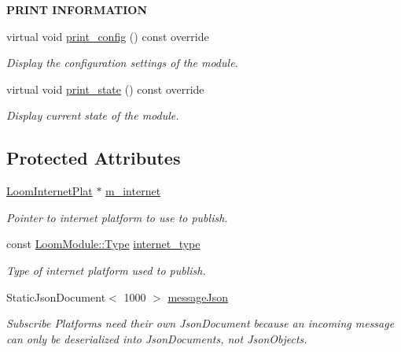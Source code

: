 \begin{Indent}{\bf P\+R\+I\+NT I\+N\+F\+O\+R\+M\+A\+T\+I\+ON}\par
\begin{DoxyCompactItemize}
\item 
virtual void \hyperlink{class_loom_subscribe_plat_a574b062d74e998a12cdb54d265c36972}{print\+\_\+config} () const override
\begin{DoxyCompactList}\small\item\em Display the configuration settings of the module. \end{DoxyCompactList}\item 
virtual void \hyperlink{class_loom_subscribe_plat_ace7e2ccbd9a8b5155bfabb2fd2e38d33}{print\+\_\+state} () const override
\begin{DoxyCompactList}\small\item\em Display current state of the module. \end{DoxyCompactList}\end{DoxyCompactItemize}
\end{Indent}
\subsection*{Protected Attributes}
\begin{DoxyCompactItemize}
\item 
\hyperlink{class_loom_internet_plat}{Loom\+Internet\+Plat} $\ast$ \hyperlink{class_loom_subscribe_plat_ab3992d3d1cc20c9e46794142f5e778e2}{m\+\_\+internet}
\begin{DoxyCompactList}\small\item\em Pointer to internet platform to use to publish. \end{DoxyCompactList}\item 
const \hyperlink{class_loom_module_aee91d0a75140d51ee428fc2d4417d865}{Loom\+Module\+::\+Type} \hyperlink{class_loom_subscribe_plat_ac1f89a414dd68151b156c3d76a5cbffe}{internet\+\_\+type}
\begin{DoxyCompactList}\small\item\em Type of internet platform used to publish. \end{DoxyCompactList}\item 
Static\+Json\+Document$<$ 1000 $>$ \hyperlink{class_loom_subscribe_plat_ae06b201b8f5928c0434beeb29f0c6ac2}{message\+Json}
\begin{DoxyCompactList}\small\item\em Subscribe Platforms need their own Json\+Document because an incoming message can only be deserialized into Json\+Documents, not Json\+Objects. \end{DoxyCompactList}\end{DoxyCompactItemize}
